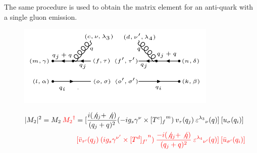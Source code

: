 %
The same procedure is used to obtain the matrix element for an anti-quark with a single gluon emission.
\begin{figure}[h!]
\centering
\includegraphics[width=0.85\textwidth]{images/QQ/qbargqMSquer.png}
\end{figure}

\begin{equation}
\begin{split}
|M_2|^2=M_2\:{\color[RGB]{255,0,0} {M_2}^{\dagger}} = [\frac{i(\not{q_j} + \not{q})}{(q_j + q)^2} (-ig_s \gamma^{\nu}\times {[T^c]_f}^m) \:{v}_{\tau}(q_j)\: {\varepsilon^{\lambda_3}}_{\nu} (q)]\: [{u}_{\sigma}(q_i)]\: \\
\quad\quad\quad\quad\quad\quad\quad\quad\:\:{\color[RGB]{255,0,0}[\bar{v}_{{\tau}^{\prime}}(q_j) \: (ig_s \gamma^{{\nu}^{\prime}}\times {[T^d]_{f^{\prime}}}^n) \: \frac{-i(\not{q_j} + \not{q})}{(q_j + q)^2} \: {\varepsilon^{\lambda_4}}_{{\nu}^{\prime}} (q)]\: [\bar{u}_{{\sigma}^{\prime}}(q_i)]}
\end{split}
\end{equation}


